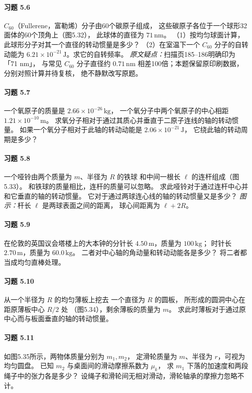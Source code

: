 \paragraph{习题 5.6}
\(C_{60}\)（Fullerene，富勒烯）分子由60个碳原子组成，
这些碳原子各位于一个球形32面体的60个顶角上（图5.32），
此球体的直径为 \(71\,\mathrm{nm}\)。
（1）按均匀球面计算，此球形分子对其一个直径的转动惯量是多少？
（2）在室温下一个 \(C_{60}\) 分子的自转动能为
\(6.21\times10^{-21}\,\mathrm J\)。求它的自转频率。
\textit{原文疑点：}扫描页185--186明确印为「71 nm」，
与常见 \(C_{60}\) 分子直径约 \(0.71\,\mathrm{nm}\)
相差100倍；本题保留原印刷数据，分别对照计算并待复核，
绝不静默改写原题。

\paragraph{习题 5.7}
一个氧原子的质量是 \(2.66\times10^{-26}\,\mathrm{kg}\)，
一个氧分子中两个氧原子的中心相距
\(1.21\times10^{-10}\,\mathrm m\)。
求氧分子相对于通过其质心并垂直于二原子连线的轴的转动惯量。
如果一个氧分子相对于此轴的转动动能是
\(2.06\times10^{-21}\,\mathrm J\)，
它绕此轴的转动周期是多少？

\paragraph{习题 5.8}
一个哑铃由两个质量为 \(m\)、半径为 \(R\) 的铁球
和中间一根长 \(\ell\) 的连杆组成（图5.33）。
和铁球的质量相比，连杆的质量可以忽略。
求此哑铃对于通过连杆中心并和它垂直的轴的转动惯量。
它对于通过两球连心线的轴的转动惯量又是多少？
\textit{图示：}杆长 \(\ell\) 是两球表面之间的距离，
球心间距离为 \(\ell+2R\)。

\paragraph{习题 5.9}
在伦敦的英国议会塔楼上的大本钟的分针长
\(4.50\,\mathrm m\)，质量为 \(100\,\mathrm{kg}\)；
时针长 \(2.70\,\mathrm m\)，质量为 \(60.0\,\mathrm{kg}\)。
二者对中心轴的角动量和转动动能各是多少？
将二者都当成均匀直棒处理。

\paragraph{习题 5.10}
从一个半径为 \(R\) 的均匀薄板上挖去
一个直径为 \(R\) 的圆板，
所形成的圆洞中心在距原薄板中心 \(R/2\) 处
（图5.34），剩余薄板的质量为 \(m\)。
求此时薄板对于通过原中心而与板面垂直的轴的转动惯量。

\paragraph{习题 5.11}
如图5.35所示，两物体质量分别为 \(m_1,m_2\)，
定滑轮质量为 \(m\)、半径为 \(r\)，可视为均匀圆盘。
已知 \(m_2\) 与桌面间的滑动摩擦系数为 \(\mu_k\)，
求 \(m_1\) 下落的加速度和两段绳子中的张力各是多少？
设绳子和滑轮间无相对滑动，滑轮轴承的摩擦力忽略不计。

